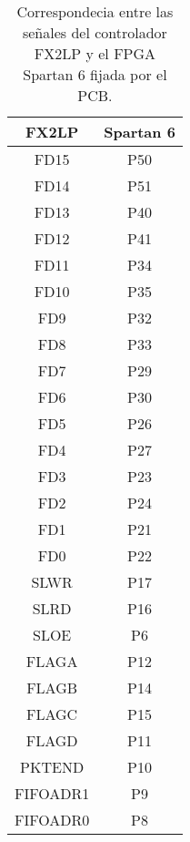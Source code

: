 \begin{table}[ht]
	\centering
\begin{tabular}{|c|c|}
	\hline
	\textbf{FX2LP} & \textbf{Spartan 6}\\
	\hline
	FD15 & P50\\
	FD14 & P51\\
	FD13 & P40\\
	FD12 & P41\\
	FD11 & P34\\
	FD10 & P35\\
	FD9 & P32\\
	FD8 & P33\\
	FD7 & P29\\
	FD6 & P30\\
	FD5 & P26\\
	FD4 & P27\\
	FD3 & P23\\
	FD2 & P24\\
	FD1 & P21\\
	FD0 & P22\\
	SLWR & P17\\
	SLRD & P16\\
	SLOE & P6\\
	FLAGA & P12\\
	FLAGB & P14\\
	FLAGC & P15\\
	FLAGD & P11\\
	PKTEND & P10\\
	FIFOADR1 & P9\\
	FIFOADR0 & P8\\
	\hline
\end{tabular}
	\caption{Correspondecia entre las señales del controlador FX2LP y el FPGA Spartan 6 fijada por el PCB.}
	\label{tab:fpga:conexion}
\end{table}

%
%

